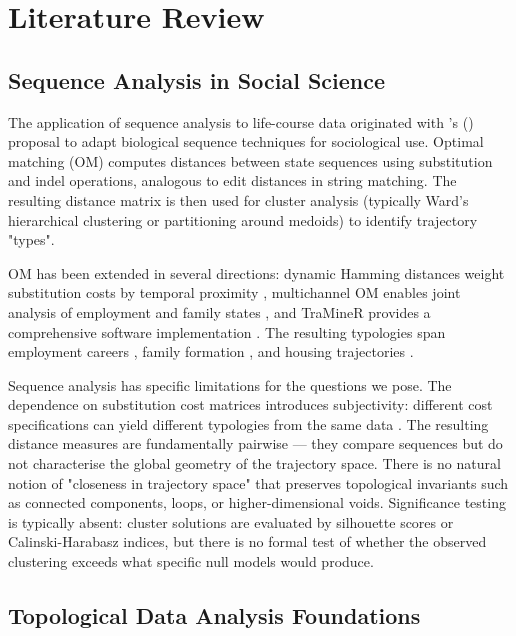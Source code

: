 \section{Literature Review}

\subsection{Sequence Analysis in Social Science}

The application of sequence analysis to life-course data originated with \citeauthor{abbott1995sequence}'s (\citeyear{abbott1995sequence}) proposal to adapt biological sequence techniques for sociological use. Optimal matching (OM) computes distances between state sequences using substitution and indel operations, analogous to edit distances in string matching. The resulting distance matrix is then used for cluster analysis (typically Ward's hierarchical clustering or partitioning around medoids) to identify trajectory "types".

OM has been extended in several directions: dynamic Hamming distances weight substitution costs by temporal proximity \citep{lesnard2010setting}, multichannel OM enables joint analysis of employment and family states \citep{gauthier2010multichannel}, and TraMineR provides a comprehensive software implementation \citep{studer2016what}. The resulting typologies span employment careers \citep{halpin1998class}, family formation \citep{elzinga2007destandardization}, and housing trajectories \citep{coulter2016rethinking}.

Sequence analysis has specific limitations for the questions we pose. The dependence on substitution cost matrices introduces subjectivity: different cost specifications can yield different typologies from the same data \citep{robette2008comparing}. The resulting distance measures are fundamentally pairwise --- they compare sequences but do not characterise the global geometry of the trajectory space. There is no natural notion of "closeness in trajectory space" that preserves topological invariants such as connected components, loops, or higher-dimensional voids. Significance testing is typically absent: cluster solutions are evaluated by silhouette scores or Calinski-Harabasz indices, but there is no formal test of whether the observed clustering exceeds what specific null models would produce.

\subsection{Topological Data Analysis Foundations}

